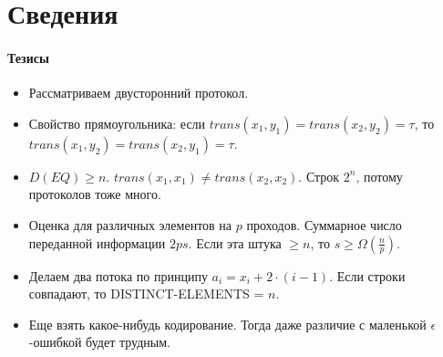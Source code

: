\section{Сведения} %
\label{sec:reductions}

\paragraph{Тезисы} %
\label{par:thesises}

\begin{itemize}
	\item Рассматриваем двусторонний протокол. 
	\item Свойство прямоугольника: если $trans(x_1, y_1) = trans(x_2, y_2) = \tau$, то 
			$trans(x_1, y_2) = trans(x_2, y_1) = \tau$. 
	\item $D(EQ) \geq n$. $trans(x_1, x_1) \neq trans(x_2, x_2)$. Строк $2^n$, потому протоколов тоже много.
	\item Оценка для различных элементов на $p$ проходов. Суммарное число переданной информации $2ps$. 
	Если эта штука $\geq n$, то $s \geq \Omega(\frac{n}{p})$.
	\item Делаем два потока по принципу $a_i = x_i + 2 \cdot (i - 1)$. Если строки совпадают, то DISTINCT-ELEMENTS = $n$.
	\item Еще взять какое-нибудь кодирование. Тогда даже различие с маленькой $\epsilon$-ошибкой будет трудным.
\end{itemize}


